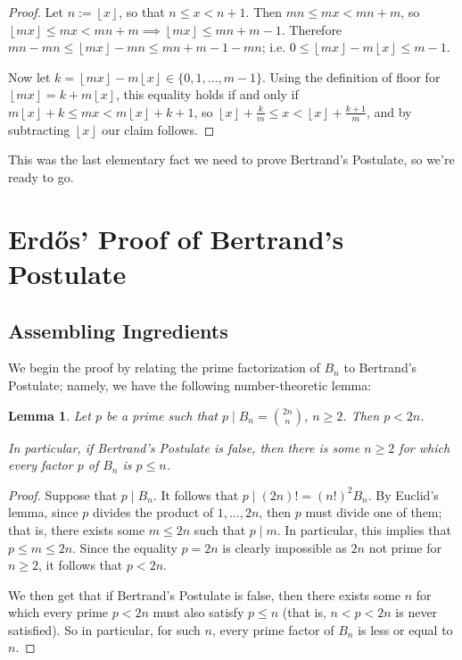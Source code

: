 \documentclass[11pt]{article}
\newtheorem{lemma}[theorem]{Lemma}
\theoremstyle{remark}
\newcommand{\floor}[1]{\left\lfloor #1 \right\rfloor}
\newcommand{\vs}{\vspace{10px}}
\begin{document}
\begin{proof}
    Let $n:=\floor{x}$, so that $n\le x<n+1$. Then $mn\le mx  < mn+m$, so $\floor{mx}\le mx<mn+m\implies \floor{mx}\le mn+m-1$. Therefore $mn-mn\le \floor{mx}-mn\le mn+m-1-mn$; i.e. $0\le \floor{mx}-m\floor{x}\le m-1$.\vspace{5px}

    Now let $k =\floor{mx}-m\floor{x}\in \{0,1,\ldots, m-1\}$. Using the definition of floor for $\floor{mx}=k+m\floor{x}$, this equality holds if and only if  $m\floor x+k\le mx< m\floor x+k+1$, so $\floor x+\frac{k}{m}\le x< \floor x+\frac{k+1}{m}$, and by subtracting $\floor x$ our claim follows.
\end{proof}\vs

This was the last elementary fact we need to prove Bertrand's Postulate, so we're ready to go.


\section{Erd\H{o}s' Proof of Bertrand's Postulate}
\subsection{Assembling Ingredients}

We begin the proof by relating the prime factorization of $B_n$ to Bertrand's Postulate; namely, we have the following number-theoretic lemma:
\begin{lemma} \label{lemma:prime_factors_are_less_than_two_n}
    Let $p$ be a prime such that $p\mid B_n= \binom{2n}{n}$, $n\ge 2$. Then $p < 2n$.

    In particular, if Bertrand's Postulate is false, then there is some $n\ge 2$ for which every factor $p$ of $B_n$ is $p\le n$.
\end{lemma}
\begin{proof}
    Suppose that $p\mid B_n$. It follows that $p\mid (2n)! = (n!)^2B_n$. By Euclid's lemma, since $p$ divides the product of $1,\ldots, 2n$, then $p$ must divide one of them; that is, there exists some $m\le 2n$ such that $p\mid m$. In particular, this implies that $p\le m\le 2n$. Since the equality $p=2n$ is clearly impossible as $2n$ not prime for $n\ge 2$, it follows that $p<2n$.
    
    We then get that if Bertrand's Postulate is false, then there exists some $n$ for which every prime $p<2n$ must also satisfy $p\le n$ (that is, $n<p<2n$ is never satisfied). So in particular, for such $n$, every prime factor of $B_n$ is less or equal to $n$.
\end{proof}\vs
\end{document}
